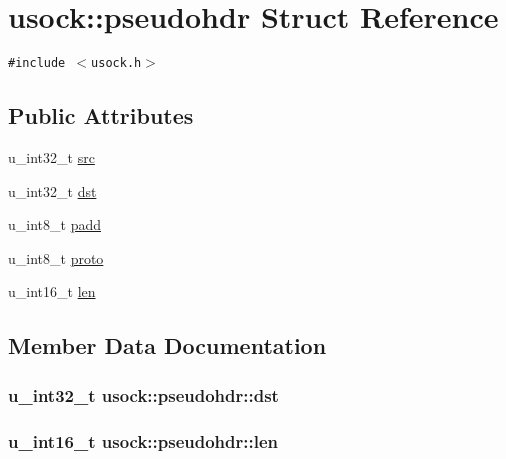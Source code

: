\hypertarget{structusock_1_1pseudohdr}{
\section{usock::pseudohdr Struct Reference}
\label{structusock_1_1pseudohdr}
}
{\tt \#include $<$usock.h$>$}

\subsection*{Public Attributes}
\begin{CompactItemize}
\item 
u\_\-int32\_\-t \hyperlink{structusock_1_1pseudohdr_4591b2ea737abb3f7745638de1e22a03}{src}
\item 
u\_\-int32\_\-t \hyperlink{structusock_1_1pseudohdr_7bf6ef2199fc88777de9b2a1aba0bc95}{dst}
\item 
u\_\-int8\_\-t \hyperlink{structusock_1_1pseudohdr_470b0a2144a312e42d1898e45a8308d7}{padd}
\item 
u\_\-int8\_\-t \hyperlink{structusock_1_1pseudohdr_9e3ab245b7abacec2c0eb35558f647c3}{proto}
\item 
u\_\-int16\_\-t \hyperlink{structusock_1_1pseudohdr_606d9d0a89f34d95fa11bbb217ed5f0a}{len}
\end{CompactItemize}


\subsection{Member Data Documentation}
\hypertarget{structusock_1_1pseudohdr_7bf6ef2199fc88777de9b2a1aba0bc95}{
\subsubsection[{dst}]{\setlength{\rightskip}{0pt plus 5cm}u\_\-int32\_\-t {\bf usock::pseudohdr::dst}}}
\label{structusock_1_1pseudohdr_7bf6ef2199fc88777de9b2a1aba0bc95}


\hypertarget{structusock_1_1pseudohdr_606d9d0a89f34d95fa11bbb217ed5f0a}{
\subsubsection[{len}]{\setlength{\rightskip}{0pt plus 5cm}u\_\-int16\_\-t {\bf usock::pseudohdr::len}}}
\label{structusock_1_1pseudohdr_606d9d0a89f34d95fa11bbb217ed5f0a}


